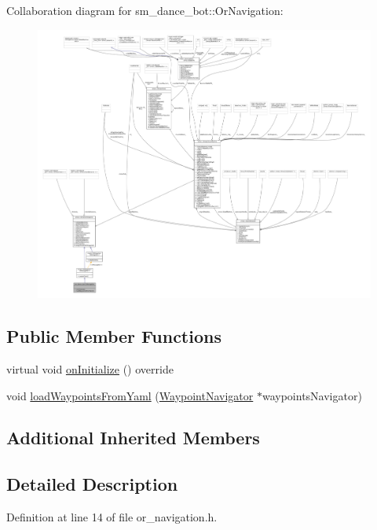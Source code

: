 Collaboration diagram for sm\+\_\+dance\+\_\+bot\+:\+:Or\+Navigation\+:
\nopagebreak
\begin{figure}[H]
\begin{center}
\leavevmode
\includegraphics[width=350pt]{classsm__dance__bot_1_1OrNavigation__coll__graph}
\end{center}
\end{figure}
\subsection*{Public Member Functions}
\begin{DoxyCompactItemize}
\item 
virtual void \hyperlink{classsm__dance__bot_1_1OrNavigation_a9f87c78f5af67024c9eda25097a135ac}{on\+Initialize} () override
\item 
void \hyperlink{classsm__dance__bot_1_1OrNavigation_a1f092ffe3a1b29ae9ea6623aff00ab16}{load\+Waypoints\+From\+Yaml} (\hyperlink{classcl__move__base__z_1_1WaypointNavigator}{Waypoint\+Navigator} $\ast$waypoints\+Navigator)
\end{DoxyCompactItemize}
\subsection*{Additional Inherited Members}


\subsection{Detailed Description}


Definition at line 14 of file or\+\_\+navigation.\+h.



